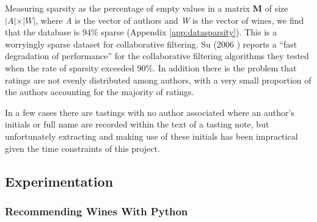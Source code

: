 Measuring sparsity as the percentage of empty values in a matrix \textbf{M} of size $\vert \textit{A} \vert \times \vert \textit{W} \vert$, where \textit{A} is the vector of authors and \textit{W} is the vector of wines, we find that the database is 94\% sparse (Appendix \ref{app:datasparsity}). This is a worryingly sparse dataset for collaborative filtering. Su (2006 \cite{Su06}) reports a ``fast degradation of performance'' for the collaborative filtering algorithms they tested when the rate of sparsity exceeded 90\%. In addition there is the problem that ratings are not evenly distributed among authors, with a very small proportion of the authors accounting for the majority of ratings.

In a few cases there are tastings with no author associated where an author's initials or full name are recorded within the text of a tasting note, but unfortunately extracting and making use of these initials has been impractical given the time constraints of this project.

\subsection{Experimentation}

\subsubsection{Recommending Wines With Python}

